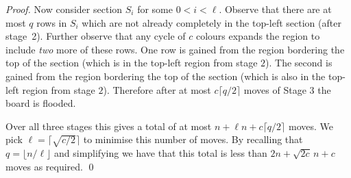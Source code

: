 \documentclass[a4paper,11pt]{llncs}
\newcounter{l}
\begin{document}
\begin{proof}
Now consider section $S_i$ for some $0 < i < \ell$. Observe that there are at most $q$ rows in $S_i$ which are not already completely in the top-left section (after stage~2). Further observe that any cycle of $c$ colours expands the region to include \emph{two} more of these rows. One row is gained from the region bordering the top of the section (which is in the top-left region from stage $2$). The second is gained from the region bordering the top of the section (which is also in the top-left region from stage $2$). Therefore after at most $c\lceil{q/2}\rceil$ moves of Stage $3$ the board is flooded.

Over all three stages this gives a total of at most $n + \ell n + c\lceil{q/2}\rceil$ moves. We pick $\ell=\lceil{{\sqrt{c/2}}}\rceil$ to minimise this number of moves. By recalling that $q=\lfloor n/\ell \rfloor$ and simplifying we have that this total is less than $2n + {\sqrt{2c}\,n} + c$ moves as required. \qed
\end{proof}
\end{document}
